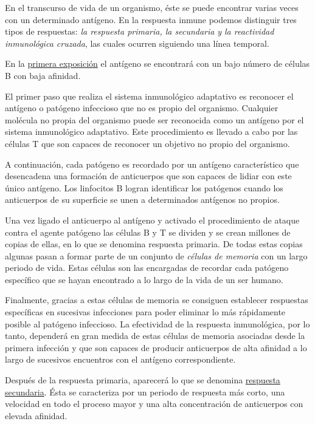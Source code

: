 \documentclass[10pt,a4paper]{article}
\begin{document}
	En el transcurso de vida de un organismo, éste se puede encontrar
	varias veces con un determinado antígeno. En la respuesta inmune podemos
	distinguir tres tipos de respuestas: \textit{la respuesta primaria, la secundaria}
	\textit{y la reactividad inmunológica cruzada}, las cuales ocurren siguiendo una línea temporal.
	
	En la \underline{primera exposición} el antígeno se encontrará con un bajo número de
	células B con baja afinidad.
	
	El primer paso que realiza el sistema inmunológico adaptativo es reconocer el antígeno o patógeno infeccioso
	que no es propio del organismo. Cualquier molécula no propia del organismo puede
	ser reconocida como un antígeno por el sistema inmunológico adaptativo. Este
	procedimiento es llevado a cabo por las células T que son capaces de reconocer un
	objetivo no propio del organismo.
	
	A continuación, cada patógeno es recordado por un antígeno característico que desencadena una formación de anticuerpos que son	capaces de lidiar con este único antígeno. Los linfocitos B logran identificar los patógenos cuando los anticuerpos de su superficie se unen a determinados antígenos no propios.
	
	Una vez ligado el anticuerpo al antígeno y activado el procedimiento de ataque contra el agente patógeno las células B y T se dividen y se crean millones de copias de ellas, en lo que se denomina respuesta primaria. De todas estas copias	algunas pasan a formar parte de un conjunto de \textit{células de memoria} con un largo periodo de vida. Estas células son las encargadas de recordar cada patógeno
	específico que se hayan encontrado a lo largo de la vida de un ser humano.
	
	Finalmente, gracias a estas células de memoria se consiguen establecer respuestas específicas en sucesivas infecciones para poder eliminar lo más rápidamente posible al patógeno infeccioso. La efectividad de la respuesta inmunológica, por lo tanto, dependerá en gran medida de estas células de memoria
	asociadas desde la primera infección y que son capaces de producir anticuerpos de
	alta afinidad a lo largo de sucesivos encuentros con el antígeno correspondiente.
	
	Después de la respuesta primaria, aparecerá lo que se denomina \underline{respuesta
	secundaria}. Ésta se caracteriza por un periodo de respuesta más corto, una
	velocidad en todo el proceso mayor y una alta concentración de anticuerpos con
	elevada afinidad.
	
\end{document}
